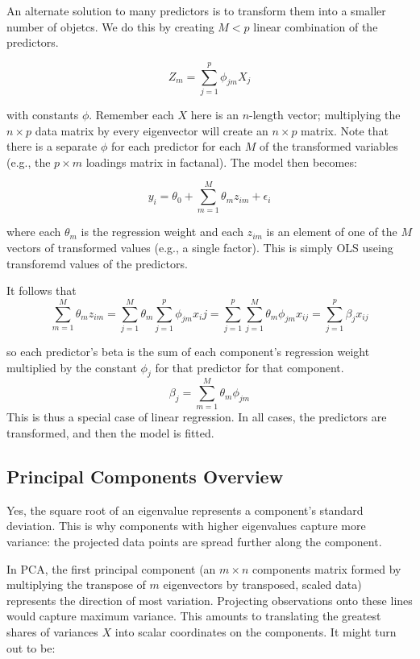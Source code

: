 \documentclass[
]{article}
\begin{document}
An alternate solution to many predictors is to transform them into a
smaller number of objetcs. We do this by creating \(M <p\) linear
combination of the predictors.

\[Z_m=\sum^p_{j=1}\phi_{jm}X_j\]

with constants \(\phi\). Remember each \(X\) here is an \(n\)-length
vector; multiplying the \(n\times{p}\) data matrix by every eigenvector
will create an \(n\times{p}\) matrix. Note that there is a separate
\(\phi\) for each predictor for each \(M\) of the transformed variables
(e.g., the \(p \times m\) loadings matrix in factanal). The model then
becomes:

\[y_i = \theta_0 + \sum^M_{m=1}\theta_mz_{im}+\epsilon_i\]

where each \(\theta_m\) is the regression weight and each \(z_{im}\) is
an element of one of the \(M\) vectors of transformed values (e.g., a
single factor). This is simply OLS useing transforemd values of the
predictors.

It follows that
\[\sum^M_{m=1}\theta_mz_{im} =\sum^M_{j=1}\theta_m\sum^p_{j=1}\phi_{jm}x_ij =\sum^p_{j=1}\sum^M_{j=1}\theta_m\phi_{jm}x_{ij}=\sum^p_{j=1}\beta_jx_{ij}\]

so each predictor's beta is the sum of each component's regression
weight multiplied by the constant \(\phi_j\) for that predictor for that
component. \[\beta_j=\sum^M_{m=1}\theta_m\phi_{jm}\]This is thus a
special case of linear regression. In all cases, the predictors are
transformed, and then the model is fitted.

\hypertarget{principal-components-overview}{%
\subsection{Principal Components
Overview}\label{principal-components-overview}}

Yes, the square root of an eigenvalue represents a component's standard
deviation. This is why components with higher eigenvalues capture more
variance: the projected data points are spread further along the
component.

In PCA, the first principal component (an \(m\times{n}\) components
matrix formed by multiplying the transpose of \(m\) eigenvectors by
transposed, scaled data) represents the direction of most variation.
Projecting observations onto these lines would capture maximum variance.
This amounts to translating the greatest shares of variances \(X\) into
scalar coordinates on the components. It might turn out to be:
\end{document}
